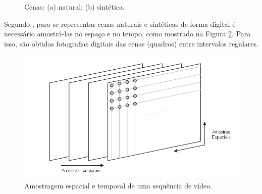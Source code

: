 \begin{figure}[h]
    \centering
    \qquad
    \caption{Cenas: (a) natural; (b) sintética.}%
	    
    \label{fig:RGB}%
\end{figure}

Segundo \cite{garcia2013tecnicas}, para se representar cenas naturais e sintéticas de forma digital é necessário amostrá-las no espaço e no tempo, como mostrado na Figura \ref{AMOSTRAGEM_VIDEO}. Para isso, são obtidas fotografias digitais das cenas (quadros) entre intervalos regulares.

\begin{figure}[h]
	\centering
	\includegraphics[scale=0.65]{figuras/AMOSTRAGEM_VIDEO.png}
	\caption{Amostragem espacial e temporal de uma sequência de vídeo.}
	\label{AMOSTRAGEM_VIDEO}
\end{figure}

